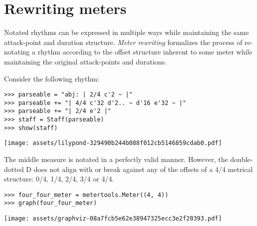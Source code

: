 \section{Rewriting meters}

Notated rhythms can be expressed in multiple ways while maintaining the same
attack-point and duration structure. \emph{Meter rewriting} formalizes the
process of re-notating a rhythm according to the offset structure inherent to
some meter while maintaining the original attack-points and durations.

Consider the following rhythm:

\begin{comment}
<abjad>
parseable = "abj: | 2/4 c'2 ~ |"
parseable += "| 4/4 c'32 d'2.. ~ d'16 e'32 ~ |"
parseable += "| 2/4 e'2 |"
staff = Staff(parseable)
show(staff)
</abjad>
\end{comment}

\begin{singlespacing}
\vspace{-0.5\baselineskip}
\begin{lstlisting}
>>> parseable = "abj: | 2/4 c'2 ~ |"
>>> parseable += "| 4/4 c'32 d'2.. ~ d'16 e'32 ~ |"
>>> parseable += "| 2/4 e'2 |"
>>> staff = Staff(parseable)
>>> show(staff)
\end{lstlisting}
\noindent\texttt{[image: assets/lilypond-329490b244b088f012cb5146859cdab0.pdf]}
\end{singlespacing}

The middle measure is notated in a perfectly valid manner. However, the
double-dotted D does not align with or break against any of the offsets of a
4/4 metrical structure: 0/4, 1/4, 2/4, 3/4 or 4/4.

\begin{comment}
<abjad>
four_four_meter = metertools.Meter((4, 4))
graph(four_four_meter)
</abjad>
\end{comment}

\begin{singlespacing}
\vspace{-0.5\baselineskip}
\begin{lstlisting}
>>> four_four_meter = metertools.Meter((4, 4))
>>> graph(four_four_meter)
\end{lstlisting}
\noindent\texttt{[image: assets/graphviz-08a7fcb5e62e38947325ecc3e2f20393.pdf]}
\end{singlespacing}

